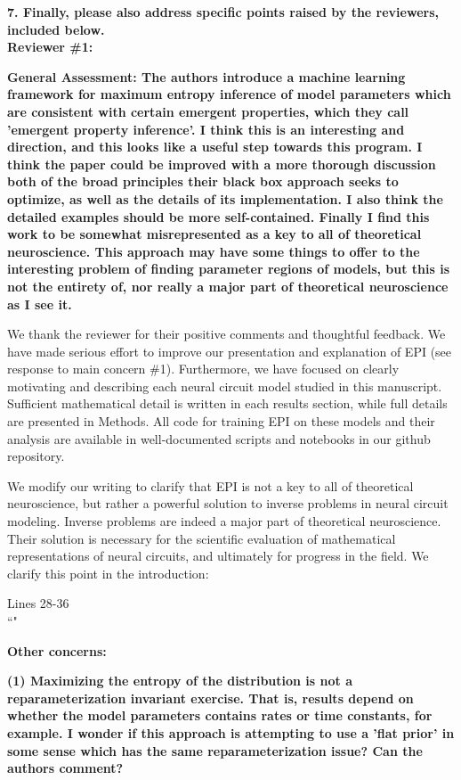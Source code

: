 \documentclass[11pt,a4paper]{article}
\begin{document}
\textbf{7. Finally, please also address specific points raised by the reviewers, included below. } \\

{\Large \textbf{Reviewer \#1: }}

\textbf{General Assessment: The authors introduce a machine learning framework for maximum entropy inference of model parameters which are consistent with certain emergent properties, which they call 'emergent property inference'. I think this is an interesting and direction, and this looks like a useful step towards this program. I think the paper could be improved with a more thorough discussion both of the broad principles their black box approach seeks to optimize, as well as the details of its implementation. I also think the detailed examples should be more self-contained. Finally I find this work to be somewhat misrepresented as a key to all of theoretical neuroscience. This approach may have some things to offer to the interesting problem of finding parameter regions of models, but this is not the entirety of, nor really a major part of theoretical neuroscience as I see it. }

We thank the reviewer for their positive comments and thoughtful feedback.
We have made serious effort to improve our presentation and explanation of EPI (see response to main concern \#1).
Furthermore, we have focused on clearly motivating and describing each neural circuit model studied in this manuscript.
Sufficient mathematical detail is written in each results section, while full details are presented in Methods.
All code for training EPI on these models and their analysis are available in well-documented scripts and notebooks in our github repository.

We modify our writing to clarify that EPI is not a key to all of theoretical neuroscience, but rather a powerful solution to inverse problems in neural circuit modeling.
Inverse problems are indeed a major part of theoretical neuroscience.
Their solution is necessary for the scientific evaluation of mathematical representations of neural circuits, and ultimately for progress in the field.
We clarify this point in the introduction:

\begin{displayquote}
Lines 28-36 \\
``"
\end{displayquote}

\textbf{Other concerns: }

\textbf{(1) Maximizing the entropy of the distribution is not a reparameterization invariant exercise. That is, results depend on whether the model parameters contains rates or time constants, for example. I wonder if this approach is attempting to use a 'flat prior' in some sense which has the same reparameterization issue? Can the authors comment? }
\end{document}
